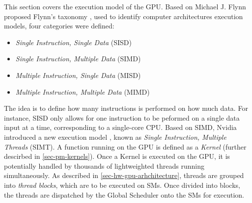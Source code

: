 This section covers the execution model of the GPU.
Based on Michael J. Flynn proposed Flynn's taxonomy \cite{Flynn1972}, used to identify computer architectures execution models, four categories were defined:

\begin{itemize}
	\item \textit{Single Instruction, Single Data} (SISD)
	\item \textit{Single Instruction, Multiple Data} (SIMD)
	\item \textit{Multiple Instruction, Single Data} (MISD)
	\item \textit{Multiple Instruction, Multiple Data} (MIMD)
\end{itemize}

The idea is to define how many instructions is performed on how much data.
For instance, SISD only allows for one instruction to be peformed on a single data input at a time, corresponding to a single-core CPU.
Based on SIMD, Nvidia introduced a new execution model \cite{Nvidia2009}, known as \textit{Single Instruction, Multiple Threads} (SIMT).
A function running on the GPU is defined as a \textit{Kernel} (further descirbed in \cref{sec-pm-kernels}).
Once a Kernel is executed on the GPU, it is potentially handled by thousands of lightweighted threads running simultaneously. 
As described in \cref{sec-hw-gpu-arhchitecture}, threads are grouped into \textit{thread blocks}, which are to be executed on SMs.
Once divided into blocks, the threads are dispatched by the Global Scheduler onto the SMs for execution.



